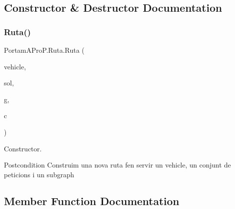 \subsection{Constructor \& Destructor Documentation}
\mbox{\label{class_portam_a_pro_p_1_1_ruta_aab7322baacb2b1bec9825d98c04b98aa}} 
\subsubsection{\texorpdfstring{Ruta()}{Ruta()}}
{\footnotesize\ttfamily Portam\+A\+Pro\+P.\+Ruta.\+Ruta (\begin{DoxyParamCaption}\item[{\hyperlink{class_portam_a_pro_p_1_1_vehicle}{Vehicle}}]{vehicle,  }\item[{Tree\+Set$<$ \hyperlink{class_portam_a_pro_p_1_1_peticio}{Peticio} $>$}]{sol,  }\item[{Graph}]{g,  }\item[{int \mbox{[}$\,$\mbox{]}}]{c }\end{DoxyParamCaption})}



Constructor. 

\begin{DoxyPostcond}{Postcondition}
Construim una nova ruta fen servir un vehicle, un conjunt de peticions i un subgraph 
\end{DoxyPostcond}


\subsection{Member Function Documentation}
\mbox{\label{class_portam_a_pro_p_1_1_ruta_a02289a460a871a5016fd9725aa46828a}} 
